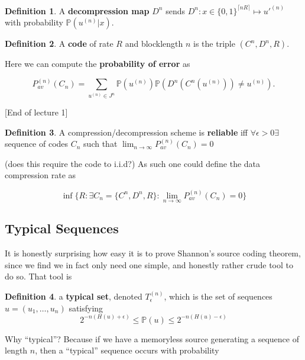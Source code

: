 \documentclass{article}
\theoremstyle{definition}
\newtheorem{definition}{Definition}
\begin{document}
\begin{definition}
  A \textbf{decompression map} $D^n$ sends $D^n : x \in \{0, 1\}^{\lceil n R
    \rceil} \mapsto u'^{(n)}$ with probability $\mathbb{P}(u^{(n)} | x)$.
\end{definition}

\begin{definition}
  A \textbf{code} of rate $R$ and blocklength $n$ is the triple $(C^n, D^n, R)$.
\end{definition}

Here we can compute the \textbf{probability of error} as

\begin{equation}
  P^{(n)}_{av}(C_n) = \sum_{u^{(n)} \in J^n} \mathbb{P}(u^{(n)}) \mathbb{P}(D^n
  (C^n(u^{(n)})) \neq u^{(n)}).
\end{equation}

[End of lecture 1]

\begin{definition}
  A compression/decompression scheme is \textbf{reliable} iff $\forall \epsilon
  > 0 \exists $ sequence of codes $C_n$ such that $\lim_{n \to \infty}
  P_{av}^{(n)} (C_n) = 0$
\end{definition}
(does this require the code to i.i.d?) As such one could define the data
compression rate as

\begin{equation}
  \inf \{ R : \exists C_n = \{C^n, D^n, R\} : \lim_{n \to \infty} P_{av}^{(n)}(C_n) = 0 \}
\end{equation}

\subsection{Typical Sequences}

It is honestly surprising how easy it is to prove Shannon's source coding
theorem, since we find we in fact only need one simple, and honestly rather
crude tool to do so. That tool is

\begin{definition}
  a \textbf{typical set}, denoted $T_\epsilon^{(n)}$, which is the set of
  sequences $u = (u_1, \dots, u_n)$ satisfying
  \begin{equation}
    2^{-n (H(u) + \epsilon)} \leq \mathbb{P}(u) \leq 2^{-n(H(u) - \epsilon)}
  \end{equation}
\end{definition}

Why ``typical''? Because if we have a memoryless source generating a sequence of
length $n$, then a ``typical'' sequence occurs with probability
\end{document}
